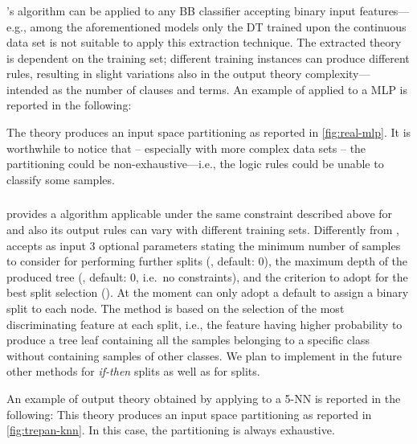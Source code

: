 \documentclass[12pt,a4paper,openright,twoside]{book}
\begin{document}
\subsubsection{\real{}}\label{sssec:real}

\psyke{}'s \real{} algorithm can be applied to any BB classifier accepting binary input features---e.g., among the aforementioned models only the DT trained upon the continuous data set is not suitable to apply this extraction technique.
%
The extracted theory is dependent on the training set; different training instances can produce different rules, resulting in slight variations also in the output theory complexity---intended as the number of clauses and terms.
%
An example of \real{} applied to a MLP is reported in the following:
%

The theory produces an input space partitioning as reported in \cref{fig:real-mlp}.
%
It is worthwhile to notice that -- especially with more complex data sets -- the partitioning could be non-exhaustive---i.e., the logic rules could be unable to classify some samples.

\subsubsection{\trepan{}}

\psyke{} provides a \trepan{} algorithm applicable under the same constraint described above for \real{} and also its output rules can vary with different training sets.
%
Differently from \real{}, \trepan{} accepts as input 3 optional parameters
%
stating the minimum number of samples to consider for performing further splits (, default: 0), the maximum depth of the produced tree (, default: 0, i.e.\ no constraints), and the criterion to adopt for the best split selection ().
%
At the moment \psyke{} can only adopt a default  to assign a binary split  to each \trepan{} node.
%
The method is based on the selection of the most discriminating feature at each split, i.e., the feature having higher probability to produce a tree leaf containing all the samples belonging to a specific class without containing samples of other classes.
%
We plan to implement in the future other methods for \emph{if-then} splits as well as for \mofn splits.

An example of output theory obtained by applying \trepan{} to a 5-NN is reported in the following:
%
%
This theory produces an input space partitioning as reported in \cref{fig:trepan-knn}.
%
In this case, the partitioning is always exhaustive.
\end{document}
